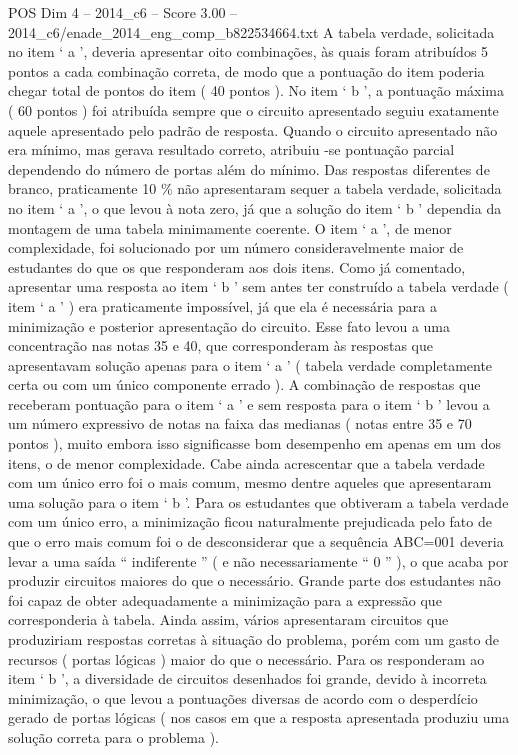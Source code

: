 \begin{textsample}{POS Dim 4 – 2014\_c6 – Score 3.00 – 2014\_c6/enade\_2014\_eng\_comp\_b822534664.txt}
A tabela verdade, solicitada no item ‘ a ’, deveria apresentar oito combinações, às quais foram atribuídos 5 pontos a cada combinação correta, de modo que a pontuação do item poderia chegar total de pontos do item ( 40 pontos ).
No item ‘ b ’, a pontuação máxima ( 60 pontos ) foi atribuída sempre que o circuito apresentado seguiu exatamente aquele apresentado pelo padrão de resposta.
Quando o circuito apresentado não era mínimo, mas gerava resultado correto, atribuiu -se pontuação parcial dependendo do número de portas além do mínimo.
Das respostas diferentes de branco, praticamente 10 \% não apresentaram sequer a tabela verdade, solicitada no item ‘ a ’, o que levou à nota zero, já que a solução do item ‘ b ’ dependia da montagem de uma tabela minimamente coerente.
O item ‘ a ’, de menor complexidade, foi solucionado por um número consideravelmente maior de estudantes do que os que responderam aos dois itens.
Como já comentado, apresentar uma resposta ao item ‘ b ’ sem antes ter construído a tabela verdade ( item ‘ a ’ ) era praticamente impossível, já que ela é necessária para a minimização e posterior apresentação do circuito.
Esse fato levou a uma concentração nas notas 35 e 40, que corresponderam às respostas que apresentavam solução apenas para o item ‘ a ’ ( tabela verdade completamente certa ou com um único componente errado ).
A combinação de respostas que receberam pontuação para o item ‘ a ’ e sem resposta para o item ‘ b ’ levou a um número expressivo de notas na faixa das medianas ( notas entre 35 e 70 pontos ), muito embora isso significasse bom desempenho em apenas em um dos itens, o de menor complexidade.
Cabe ainda acrescentar que a tabela verdade com um único erro foi o mais comum, mesmo dentre aqueles que apresentaram uma solução para o item ‘ b ’.
Para os estudantes que obtiveram a tabela verdade com um único erro, a minimização ficou naturalmente prejudicada pelo fato de que o erro mais comum foi o de desconsiderar que a sequência ABC=001 deveria levar a uma saída “ indiferente ” ( e não necessariamente “ 0 ” ), o que acaba por produzir circuitos maiores do que o necessário.
Grande parte dos estudantes não foi capaz de obter adequadamente a minimização para a expressão que corresponderia à tabela.
Ainda assim, vários apresentaram circuitos que produziriam respostas corretas à situação do problema, porém com um gasto de recursos ( portas lógicas ) maior do que o necessário.
Para os responderam ao item ‘ b ’, a diversidade de circuitos desenhados foi grande, devido à incorreta minimização, o que levou a pontuações diversas de acordo com o desperdício gerado de portas lógicas ( nos casos em que a resposta apresentada produziu uma solução correta para o problema ).

\end{textsample}
